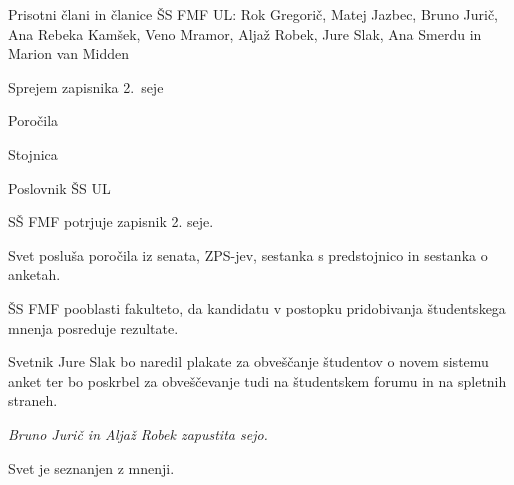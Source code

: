 \documentclass{seja}
\begin{document}
Prisotni člani in članice ŠS FMF UL:  Rok Gregorič, Matej Jazbec, Bruno Jurič,
Ana Rebeka Kamšek, Veno Mramor, Aljaž Robek, Jure Slak, Ana Smerdu in Marion van
Midden

\begin{red*}
\item Sprejem zapisnika 2.\ seje
\item Poročila
\item Stojnica
\item Poslovnik ŠS UL
\end{red*}

\begin{ad}
\item
\begin{sklep*}
  SŠ FMF potrjuje zapisnik 2. seje.
\end{sklep*}

\item Svet posluša poročila iz senata, ZPS-jev, sestanka s predstojnico in
  sestanka o anketah.

\begin{sklep*}
  ŠS FMF pooblasti fakulteto, da kandidatu v postopku pridobivanja študentskega
  mnenja posreduje rezultate.
\end{sklep*}


\begin{sklep*}
  Svetnik Jure Slak bo naredil plakate za obveščanje študentov o novem sistemu
  anket ter bo poskrbel za obveščevanje tudi na študentskem forumu in na
  spletnih straneh.
\end{sklep*}

\textit{Bruno Jurič in Aljaž Robek zapustita sejo.}

\item Svet je seznanjen z mnenji.


\end{ad}
\end{document}
